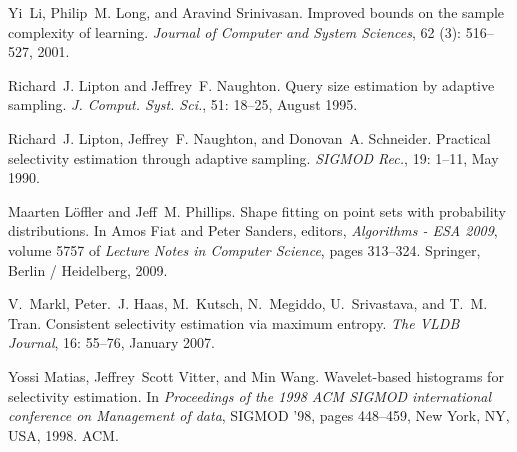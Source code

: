 \begin{thebibliography}{67}
Yi~Li, Philip~M. Long, and Aravind Srinivasan.
\newblock Improved bounds on the sample complexity of learning.
\newblock \emph{Journal of Computer and System Sciences}, 62
  (3): 516--527, 2001.

Richard~J. Lipton and Jeffrey~F. Naughton.
\newblock Query size estimation by adaptive sampling.
\newblock \emph{J. Comput. Syst. Sci.}, 51: 18--25, August 1995.

Richard~J. Lipton, Jeffrey~F. Naughton, and Donovan~A. Schneider.
\newblock Practical selectivity estimation through adaptive sampling.
\newblock \emph{SIGMOD Rec.}, 19: 1--11, May 1990.

Maarten L\"{o}ffler and Jeff~M. Phillips.
\newblock Shape fitting on point sets with probability distributions.
\newblock In Amos Fiat and Peter Sanders, editors, \emph{Algorithms - ESA
  2009}, volume 5757 of \emph{Lecture Notes in Computer Science}, pages
  313--324. Springer, Berlin / Heidelberg, 2009.

V.~Markl, Peter.~J. Haas, M.~Kutsch, N.~Megiddo, U.~Srivastava, and T.~M. Tran.
\newblock Consistent selectivity estimation via maximum entropy.
\newblock \emph{The VLDB Journal}, 16: 55--76, January 2007.

Yossi Matias, Jeffrey~Scott Vitter, and Min Wang.
\newblock Wavelet-based histograms for selectivity estimation.
\newblock In \emph{Proceedings of the 1998 ACM SIGMOD international conference
  on Management of data}, SIGMOD '98, pages 448--459, New York, NY, USA, 1998.
  ACM.


\end{thebibliography}
